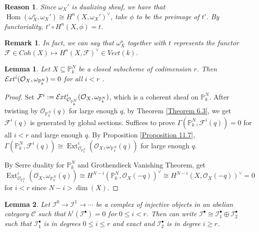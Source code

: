 \documentclass{ctexart}
\newtheorem{remark}{Remark}[section]
\newtheorem{lemma}{Lemma}[section]
\newtheorem{reason}{Reason}[section]
\renewcommand{\hom}{\operatorname{Hom}}
\newcommand{\ext}{\operatorname{Ext}}
\newcommand{\sheafext}{\mathcal{E}\kern -.5pt xt}
\begin{document}
\begin{reason}
    Since $\omega_{X}'$ is dualizing sheaf, we have that $\hom(\omega_{X}^{o}, \omega_{X}') \cong H^{n}(X, \omega_{X}')^{\lor}$, take $\phi$ to be the preimage of $t'$.
    By functoriality, $t' \circ H^{n}(X, \phi) = t$.
\end{reason}
\begin{remark}
    In fact, we can say that $\omega_{X}^{o}$ together with $t$ represents the functor $\mathcal{F}\in Coh(X) \longmapsto H^{n}(X, \mathcal{F})^{\lor}\in Vect(k)$.
\end{remark}
\begin{lemma}
    Let $X \subseteq \mathbb{P}_{k}^{N}$ be a closed subscheme of codimension $r$.
    Then $\sheafext^{i}(\mathcal{O}_{X}, \omega_{\mathbb{P}_{k}^{N}}) = 0$ for all $i < r$
    \label{Lemma 11.3}.
\end{lemma}
\begin{proof}
    Set $\mathcal{F}^{i} := \sheafext_{\mathcal{O}_{\mathbb{P}_{k}^{N}}}^{i}(\mathcal{O}_{X}, \omega_{\mathbb{P}_{k}^{N}})$, which is a coherent sheaf on $\mathbb{P}_{k}^{N}$.
    After twisting by $\mathcal{O}_{\mathbb{P}_{k}^{N}}(q)$ for large enough $q$, by Theorem \ref{Theorem 6.3}, we get $\mathcal{F}^{i}(q)$ is generated by global sections.
    Suffices to prove $\Gamma(\mathbb{P}_{k}^{N}, \mathcal{F}^{i}(q)) = 0$ for all $i < r$ and large enough $q$.
    By Proposition \ref{Proposition 11.7}, $\Gamma(\mathbb{P}_{k}^{N}, \mathcal{F}^{i}(q)) \cong \ext_{\mathcal{O}_{\mathbb{P}_{k}^{N}}}^{i}(\mathcal{O}_{X}, \omega_{\mathbb{P}_{k}^{N}}(q))$ for large enough $q$.
    \par
    By Serre duality for $\mathbb{P}_{k}^{N}$ and Grothendieck Vanishing Theorem, get 
    \begin{equation*}
        \ext^{i}_{\mathcal{O}_{\mathbb{P}_{k}^{N}}}(\mathcal{O}_{X}, \omega_{\mathbb{P}_{k}^{N}}(q)) \cong H^{N - i}(\mathbb{P}_{k}^{N}, \mathcal{O}_{X}(-q))^{\lor} \cong H^{N - i}(X, \mathcal{O}_{X}(-q))^{\lor} = 0
    \end{equation*}
    for $i < r$ since $N - i > \dim(X)$.
\end{proof}
\begin{lemma}
    Let $\mathcal{I}^{0} \rightarrow \mathcal{I}^{1} \rightarrow \cdots$ be a complex of injective objects in an abelian category $\mathcal{C}$ such that $h^{i}(\mathcal{I}^{\bullet}) = 0$ for $0 \le i < r$.
    Then can write $\mathcal{I}^{\bullet} \cong \mathcal{I}_{1}^{\bullet} \oplus \mathcal{I}_{2}^{\bullet}$ such that $\mathcal{I}_{1}^{\bullet}$ is in degrees $0 \le i \le r$ and exact and $\mathcal{I}_{2}^{\bullet}$ is in degree $i \ge r$.
    \label{Lemma 11.4}
\end{lemma}
\end{document}
